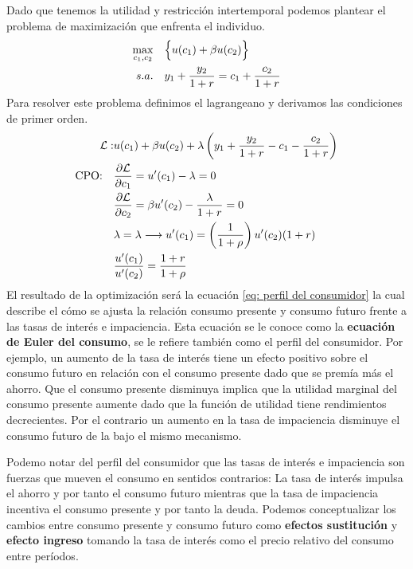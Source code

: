 Dado que tenemos la utilidad y restricción intertemporal podemos plantear el problema de maximización que enfrenta el individuo.
\begin{align*}
        \max_{c_1,c_2} & \quad \Bigl\{ u(c_1) + \beta u(c_2) \Bigr\} \\ s.a.& \quad  y_1 + \frac{y_2}{1+r} = c_1 + \frac{c_2}{1+r}
\end{align*}
Para resolver este problema definimos el lagrangeano y derivamos las condiciones de primer orden. 
\begin{align}
        \mathcal{L}:& u(c_1) + \beta u(c_2) + \lambda \left( y_1 + \frac{y_2}{1+r} - c_1 - \frac{c_2}{1+r} \right) \notag \\
        \text{CPO:} \quad & \frac{\partial \mathcal{L}}{\partial c_1} = u'(c_1) - \lambda = 0 \notag \\
        &\frac{\partial \mathcal{L}}{\partial c_2} = \beta u'(c_2) - \frac{\lambda}{1+r} = 0 \notag \\
        & \lambda = \lambda \longrightarrow u'(c_1) = \left( \frac{1}{1+\rho} \right) u'(c_2)(1+r) \notag \\
        &  \frac{u'(c_1)}{u'(c_2)} = \frac{1+r}{1+\rho} \label{eq: perfil del consumidor}
    \end{align}
El resultado de la optimización será la ecuación \ref{eq: perfil del consumidor} la cual describe el cómo se ajusta la relación consumo presente y consumo futuro frente a las tasas de interés e impaciencia. Esta ecuación se le conoce como la \textbf{ecuación de Euler del consumo}, se le refiere también como el perfil del consumidor. Por ejemplo, un aumento de la tasa de interés tiene un efecto positivo sobre el consumo futuro en relación con el consumo presente dado que se premía más el ahorro. Que el consumo presente disminuya implica que la utilidad marginal del consumo presente aumente dado que la función de utilidad tiene rendimientos decrecientes. Por el contrario un aumento en la tasa de impaciencia disminuye el consumo futuro de la bajo el mismo mecanismo.

Podemo notar del perfil del consumidor que las tasas de interés e impaciencia son fuerzas que mueven el consumo en sentidos contrarios: La tasa de interés impulsa el ahorro y por tanto el consumo futuro mientras que la tasa de impaciencia incentiva el consumo presente y por tanto la deuda. Podemos conceptualizar los cambios entre consumo presente y consumo futuro como \textbf{efectos sustitución} y \textbf{efecto ingreso} tomando la tasa de interés como el precio relativo del consumo entre períodos. 

